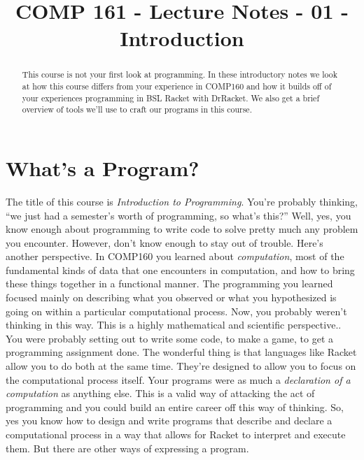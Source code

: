 \documentclass[]{tufte-handout}
\title{COMP 161 - Lecture Notes - 01 - Introduction}
\begin{document}
\maketitle

\begin{abstract}
This course is not your first look at programming. In these introductory notes we look at how this course differs from your experience in COMP160 and how it builds off of your experiences programming in BSL Racket with DrRacket.  We also get a brief overview of tools we'll use to craft our programs in this course. 
\end{abstract}

\section{What's a Program?}

The title of this course is \textit{Introduction to Programming}.  You're probably thinking, ``we just had a semester's worth of programming, so what's this?''  Well, yes, you know enough about programming to write code to solve pretty much any problem you encounter. However, don't know enough to stay out of trouble.  Here's another perspective.  In COMP160 you learned about \textit{computation}, most of the fundamental kinds of data  that one encounters in computation, and how to bring these things together in a functional manner.  The programming you learned focused mainly on describing what you observed or what you hypothesized is going on within a particular computational process.  Now, you probably weren't thinking in this way. This is a highly mathematical and scientific perspective..   You were probably setting out to write some code, to make a game, to get a programming assignment done.  The wonderful thing is that languages like Racket allow you to do both at the same time.  They're designed to allow you to focus on the computational process itself.  Your programs were as much a \textit{declaration of a computation} as anything else.  This is a valid way of attacking the act of programming and you could build an entire career off this way of thinking.  So, yes you know how to design and write programs that describe and declare a computational process in a way that allows for Racket to interpret and execute them. But there are other ways of expressing a program.
\end{document}
